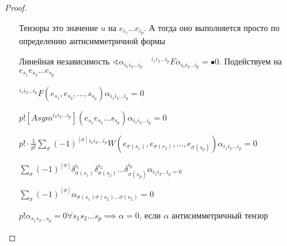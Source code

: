 \documentclass{book}
\theoremstyle{definition}
\begin{document}
\begin{proof}
\begin{itemize}
\begin{lemma}
                 Тензоры это значение $u$ на  $e_{i_1} \ldots e_{i_p}$. А тогда оно выполняется просто по определению антисимметричной формы
             \end{lemma}
         \item[Линейная независимость]
             $\sphericalangle \alpha_{i_1 i_2 \ldots i_p}\quad ^{i_1 i_2 \ldots i_p}F\alpha_{i_1 i_2 \ldots i_p} = \mathbb{•}{0}$. Подействуем на $e_{s_1} e_{s_2} \ldots e_{s_p}$

             $^{i_1 i_2 \ldots i_p}F\left( e_{s_1}, e_{s_2}, \ldots, s_{s_p}  \right) \alpha_{i_1 i_2  \ldots i_p} = 0$

             $p!\left[Asym^{i_1 i_2 \ldots i_p}\right]\left( e_{s_1} e_{s_2} \ldots s_{s_p} \right) \alpha_{i_1 i_2 \ldots i_p} = 0  $ 

             $p!\cdot \frac{1}{p!}\sum_{\sigma} (-1)^{[\sigma]}{}^{i_1 i_2 \ldots i_p}W\left( e_{\sigma(s_1)}, e_{\sigma(s_2)}, \ldots, e_{\sigma(s_p)} \right) \alpha_{i_1 i_2 \ldots i_p}  = 0$ 

                 $\sum_{\sigma} (-1)^{[\sigma]}\delta_{\sigma(s_1)}^{i_1}\delta_{\sigma(s_2)}^{i_2} \ldots \delta_{\sigma(s_p)}^{i_p} \alpha_{i_1 i_2 \ldots i_p = 0}$ 

                 $\sum_{\sigma}(-1)^{[\sigma]}\alpha_{\sigma(s_1)\sigma(s_2) \ldots \sigma(s_2)} = 0$

                 $p!\alpha_{s_1 s_2 \ldots s_p} = 0 \forall  s_1 s_2 \ldots s_p \implies  \alpha = 0$, если $\alpha$ антисимметричный тензор

     \end{itemize}
 \end{proof}
\end{document}
